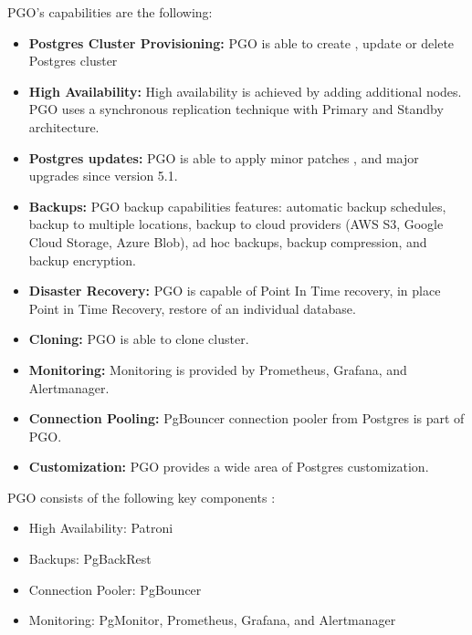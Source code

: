 PGO’s capabilities are the following:
\begin{itemize}
    \item \textbf{Postgres Cluster Provisioning:} PGO is able to create \cite{CrunchyDocCreate}, update \cite{CrunchyDocUpdate} or delete Postgres cluster \cite{CrunchyDocDelete}
    \item \textbf{High Availability:} High availability is achieved by adding additional nodes. PGO uses a synchronous replication technique with Primary and Standby architecture. \cite{CrunchyDocHA}
    \item \textbf{Postgres updates:} PGO is able to apply minor patches \cite{CrunchyDocMinorUpdates}, and major upgrades since version 5.1. \cite{CrunchyBlogUpdates}
    \item \textbf{Backups:} PGO backup capabilities features: automatic backup schedules, backup to multiple locations, backup to cloud providers (AWS S3, Google Cloud Storage, Azure Blob), ad hoc backups, backup compression, and backup encryption. \cite{CrunchyDocBackups}
    \item \textbf{Disaster Recovery:} PGO is capable of Point In Time recovery, in place Point in Time Recovery, restore of an individual database. \cite{CrunchyDocDisasterRecovery}
    \item \textbf{Cloning:} PGO is able to clone cluster. \cite{CrunchyDocDisasterRecovery}
    \item \textbf{Monitoring:} Monitoring is provided by Prometheus, Grafana, and Alertmanager. \cite{CrunchyDocMonitoring}
    \item \textbf{Connection Pooling:} PgBouncer connection pooler from Postgres is part of PGO. \cite{CrunchyDocConnectionPooling}
    \item  \textbf{Customization:} PGO provides a wide area of Postgres customization. \cite{CrunchyDocCustomisation}
\end{itemize}


PGO consists of the following key components \cite{CrunchyPGOGit}:
\begin{itemize}
    \item High Availability: Patroni
    \item Backups: PgBackRest
    \item Connection Pooler: PgBouncer
    \item Monitoring: PgMonitor, Prometheus, Grafana, and Alertmanager
\end{itemize}

